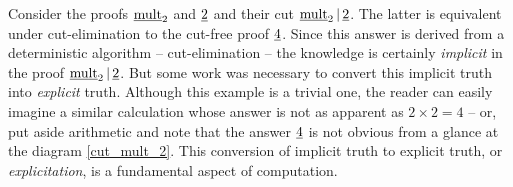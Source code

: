 \documentclass[english,letter paper,12pt,reqno]{article}
\theoremstyle{example}
\numberwithin{equation}{section}
\def\inta{\bold{int}}
\begin{document}
Consider the proofs $\underline{\mathrm{mult}}_2$ and $\underline{2}$ and their cut $\underline{\mathrm{mult}}_2 \,|\, \underline{2}$. The latter is equivalent under cut-elimination to the cut-free proof $\underline{4}$. Since this answer is derived from a deterministic algorithm -- cut-elimination -- the knowledge is certainly \emph{implicit} in the proof $\underline{\mathrm{mult}}_2 \,|\, \underline{2}$. But some work was necessary to convert this implicit truth into \emph{explicit} truth. Although this example is a trivial one, the reader can easily imagine a similar calculation whose answer is not as apparent as $2 \times 2 = 4$ -- or, put aside arithmetic and note that the answer $\underline{4}$ is not obvious from a glance at the diagram \eqref{cut_mult_2}. This conversion of implicit truth to explicit truth, or \emph{explicitation}, is a fundamental aspect of computation.
\\
\end{document}
